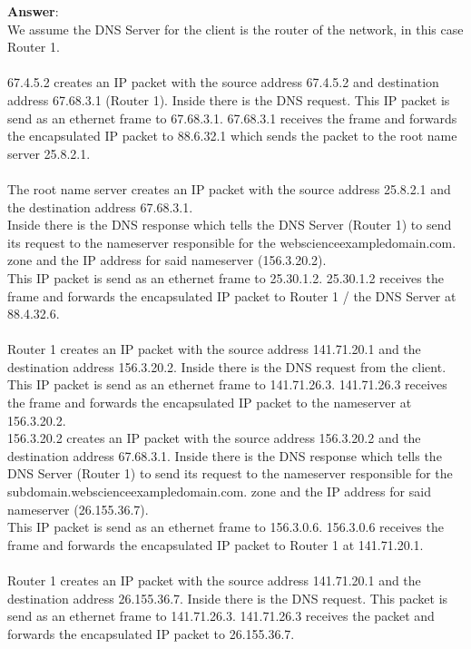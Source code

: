 \documentclass{WeSTassignment}
\begin{document}
\textbf{Answer}: \\
We assume the DNS Server for the client is the router of the network, in this case Router 1.\\
\\
67.4.5.2 creates an IP packet with the source address 67.4.5.2 and destination address 67.68.3.1 (Router 1). Inside there is the DNS request. This IP packet is send as an ethernet frame to 67.68.3.1. 
67.68.3.1 receives the frame and forwards the encapsulated IP packet to 88.6.32.1 which sends the packet to the root name server 25.8.2.1.\\
\\
The root name server creates an IP packet with the source address 25.8.2.1 and the destination address 67.68.3.1.\\
Inside there is the DNS response which tells the DNS Server (Router 1) to send its request to the nameserver responsible for the webscienceexampledomain.com. zone and the IP address for said nameserver (156.3.20.2).\\
This IP packet is send as an ethernet frame to 25.30.1.2. 25.30.1.2 receives the frame and forwards the encapsulated IP packet to Router 1 / the DNS Server at 88.4.32.6.\\
\\
Router 1 creates an IP packet with the source address 141.71.20.1 and the destination address 156.3.20.2. Inside there is the DNS request from the client. This IP packet is send as an ethernet frame to 141.71.26.3. 141.71.26.3 receives the frame and forwards the encapsulated IP packet to the nameserver at 156.3.20.2.\\
156.3.20.2 creates an IP packet with the source address 156.3.20.2 and the destination address 67.68.3.1. Inside there is the DNS response  which tells the DNS Server (Router 1) to send its request to the nameserver responsible for the subdomain.webscienceexampledomain.com. zone and the IP address for said nameserver (26.155.36.7).\\
This IP packet is send as an ethernet frame to 156.3.0.6. 156.3.0.6 receives the frame and forwards the encapsulated IP packet to Router 1 at 141.71.20.1.\\
\\
Router 1 creates an IP packet with the source address 141.71.20.1 and the destination address 26.155.36.7. Inside there is the DNS request. This packet is send as an ethernet frame to 141.71.26.3. 141.71.26.3 receives the packet and forwards the encapsulated IP packet to 26.155.36.7.\\
\end{document}
